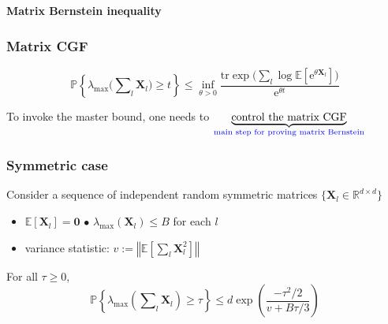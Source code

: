 \documentclass[compress,
mathserif,wide,%
]{beamer}
\begin{document}
\begin{frame}[plain]

\vfill
\begin{center}
  {\Large\bf Matrix Bernstein inequality}
\end{center}

\vfill

\end{frame}


\begin{frame}
\frametitle{Matrix CGF}  

\[
	\mathbb{P}\left\{ \lambda_{\max}\big(\sum\nolimits _{l}\bm{X}_{l}\big)\geq t\right\} \leq\inf_{\theta>0}\frac{\mathrm{tr}\exp\big(\sum\nolimits _{l}\log\mathbb{E}[\mathrm{e}^{\theta\bm{X}_{l}}]\big)}{\mathrm{e}^{\theta t}}
\]


\bigskip
\bigskip

To invoke the master bound, one needs to \hspace{-1.5em} $\underset{\textcolor{blue}{ \text{main step for proving matrix Bernstein}}}{\underbrace{\text{control the matrix CGF}}}$ 
	



\end{frame}






\begin{frame}
\frametitle{Symmetric case}  


Consider a sequence of independent random symmetric matrices $\big\{ \bm{X}_{l}\in\mathbb{R}^{d \times d}\big\} $
%
\begin{itemize}
	\itemsep0.5em
	\item $\mathbb{E}[\bm{X}_l]=\bm{0}$ \qquad\qquad\qquad\qquad\qquad $\bullet$ $\lambda_{\max}(\bm{X}_{l}) \leq B$ for each $l$
	\item variance statistic: 
	$v:= \left\Vert  \mathbb{E}\left[ \sum\nolimits_{l} \bm{X}_{l}^2  \right]  \right\Vert  $
\end{itemize}

\begin{theorem}
\label{thm:mtx-Bernstein-symmetric}
%
For all $\tau \geq 0$,
\vspace{-1em}
\[
	\mathbb{P}\left\{ \lambda_{\max}\left( \sum\nolimits_{l}\bm{X}_{l}\right ) \geq \tau\right\} \leq d \exp\left(\frac{-\tau^{2}/2}{v+B\tau/3}\right)
\]
%
\end{theorem}


\end{frame}
\end{document}
